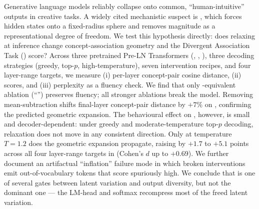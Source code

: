 Generative language models reliably collapse onto common, ``human-intuitive''
outputs in creative tasks. A widely cited mechanistic suspect is
\layernorm, which forces hidden states onto a fixed-radius sphere and removes
magnitude as a representational degree of freedom. We test this hypothesis
directly: does relaxing \layernorm at inference change concept-association
geometry and the Divergent Association Task (\dat) score? Across three
pretrained Pre-LN Transformers (\gptsmall, \gptmedium, \pythia), three
decoding strategies (greedy, top-$p$, high-temperature), seven \layernorm
intervention recipes, and four layer-range targets, we measure (i) per-layer
concept-pair cosine distance, (ii) \dat scores, and (iii) perplexity as a
fluency check. We find that only \rmsnorm-equivalent ablation
(``\nomean'') preserves fluency; all stronger ablations break the model.
Removing mean-subtraction shifts final-layer concept-pair distance by
$+7\%$ on \pythia, confirming the predicted geometric expansion. The
behavioural effect on \dat, however, is small and decoder-dependent: under
greedy and moderate-temperature top-$p$ decoding, \layernorm relaxation does
not move \dat in any consistent direction. Only at temperature $T{=}1.2$
does the geometric expansion propagate, raising \dat by $+1.7$ to $+5.1$
points across all four layer-range targets in \gptsmall (Cohen's $d$ up to
$+0.69$). We further document an artifactual ``\dat inflation'' failure mode
in which broken interventions emit out-of-vocabulary tokens that score
spuriously high. We conclude that \layernorm is one of several gates between
latent variation and output diversity, but not the dominant one --- the
LM-head and softmax recompress most of the freed latent variation.
